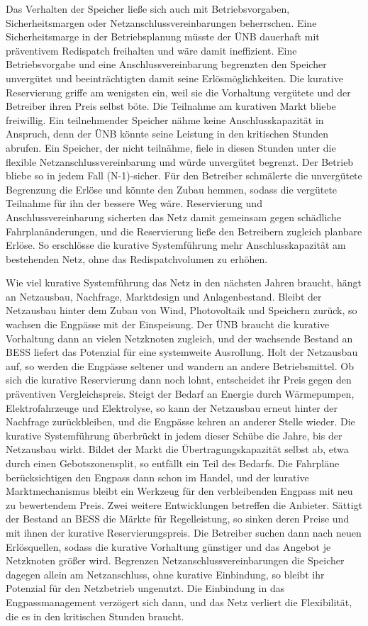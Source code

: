 Das Verhalten der Speicher ließe sich auch mit Betriebsvorgaben, Sicherheitsmargen oder Netzanschlussvereinbarungen beherrschen.
Eine Sicherheitsmarge in der Betriebsplanung müsste der \ac{ÜNB} dauerhaft mit präventivem Redispatch freihalten und wäre damit ineffizient.
Eine Betriebsvorgabe und eine Anschlussvereinbarung begrenzten den Speicher unvergütet und beeinträchtigten damit seine Erlösmöglichkeiten.
Die kurative Reservierung griffe am wenigsten ein, weil sie die Vorhaltung vergütete und der Betreiber ihren Preis selbst böte.
Die Teilnahme am kurativen Markt bliebe freiwillig.
Ein teilnehmender Speicher nähme keine Anschlusskapazität in Anspruch, denn der \ac{ÜNB} könnte seine Leistung in den kritischen Stunden abrufen.
Ein Speicher, der nicht teilnähme, fiele in diesen Stunden unter die flexible Netzanschlussvereinbarung und würde unvergütet begrenzt.
Der Betrieb bliebe so in jedem Fall (N-1)-sicher.
Für den Betreiber schmälerte die unvergütete Begrenzung die Erlöse und könnte den Zubau hemmen, sodass die vergütete Teilnahme für ihn der bessere Weg wäre.
Reservierung und Anschlussvereinbarung sicherten das Netz damit gemeinsam gegen schädliche Fahrplanänderungen, und die Reservierung ließe den Betreibern zugleich planbare Erlöse.
So erschlösse die kurative Systemführung mehr Anschlusskapazität am bestehenden Netz, ohne das Redispatchvolumen zu erhöhen.

Wie viel kurative Systemführung das Netz in den nächsten Jahren braucht, hängt an Netzausbau, Nachfrage, Marktdesign und Anlagenbestand.
Bleibt der Netzausbau hinter dem Zubau von Wind, Photovoltaik und Speichern zurück, so wachsen die Engpässe mit der Einspeisung.
Der \ac{ÜNB} braucht die kurative Vorhaltung dann an vielen Netzknoten zugleich, und der wachsende Bestand an \ac{BESS} liefert das Potenzial für eine systemweite Ausrollung.
Holt der Netzausbau auf, so werden die Engpässe seltener und wandern an andere Betriebsmittel.
Ob sich die kurative Reservierung dann noch lohnt, entscheidet ihr Preis gegen den präventiven Vergleichspreis.
Steigt der Bedarf an Energie durch Wärmepumpen, Elektrofahrzeuge und Elektrolyse, so kann der Netzausbau erneut hinter der Nachfrage zurückbleiben, und die Engpässe kehren an anderer Stelle wieder.
Die kurative Systemführung überbrückt in jedem dieser Schübe die Jahre, bis der Netzausbau wirkt.
Bildet der Markt die Übertragungskapazität selbst ab, etwa durch einen Gebotszonensplit, so entfällt ein Teil des Bedarfs.
Die Fahrpläne berücksichtigen den Engpass dann schon im Handel, und der kurative Marktmechanismus bleibt ein Werkzeug für den verbleibenden Engpass mit neu zu bewertendem Preis.
Zwei weitere Entwicklungen betreffen die Anbieter.
Sättigt der Bestand an \ac{BESS} die Märkte für Regelleistung, so sinken deren Preise und mit ihnen der kurative Reservierungspreis.
Die Betreiber suchen dann nach neuen Erlösquellen, sodass die kurative Vorhaltung günstiger und das Angebot je Netzknoten größer wird.
Begrenzen Netzanschlussvereinbarungen die Speicher dagegen allein am Netzanschluss, ohne kurative Einbindung, so bleibt ihr Potenzial für den Netzbetrieb ungenutzt.
Die Einbindung in das Engpassmanagement verzögert sich dann, und das Netz verliert die Flexibilität, die es in den kritischen Stunden braucht.

